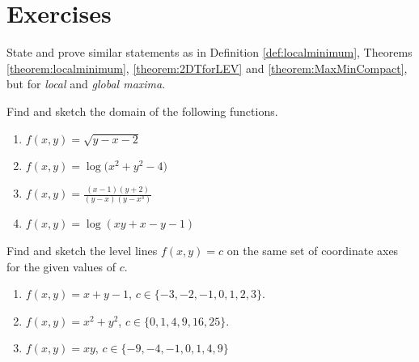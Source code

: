 
\section*{Exercises}
\begin{problem}[Advanced]
State and prove similar statements as in Definition \ref{def:localminimum}, Theorems \ref{theorem:localminimum}, \ref{theorem:2DTforLEV} and \ref{theorem:MaxMinCompact}, but for \emph{local} and \emph{global maxima}.
\end{problem}

\begin{problem}[Basic]
Find and sketch the domain of the following functions.
\begin{enumerate}
	\item $f(x,y) = \sqrt{y-x-2}$
	\item $f(x,y) = \log \big( x^2+y^2-4 \big)$
	\item $f(x,y) = \frac{(x-1)(y+2)}{(y-x)(y-x^3)}$
	\item $f(x,y) = \log (xy+x-y-1)$
\end{enumerate}
\end{problem}

\begin{problem}[Basic]
Find and sketch the level lines $f(x,y)=c$ on the same set of coordinate axes for the given values of $c$.
\begin{enumerate}
	\item $f(x,y) = x+y-1$, $c \in \{ -3, -2, -1, 0, 1, 2, 3\}$.
	\item $f(x,y) = x^2+y^2$, $c \in \{ 0, 1, 4, 9, 16, 25 \}$.
	\item $f(x,y) = xy$, $c \in \{ -9, -4, -1, 0, 1, 4, 9 \}$
\end{enumerate}
\end{problem}

